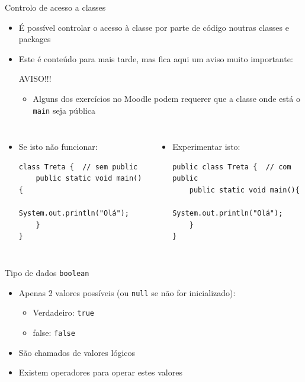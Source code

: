 \documentclass[portuguese, aspectratio=169, xcolor=table]{beamer}
\begin{document}
\begin{frame}[fragile]{Controlo de acesso a classes}
\begin{itemize}
    \item É possível controlar o acesso à classe por parte de código noutras classes e packages
    \item Este é conteúdo para mais tarde, mas fica aqui um aviso muito importante:
    \begin{alertblock}{AVISO!!!}
        \begin{itemize}
            \item Alguns dos exercícios no Moodle podem requerer que a classe onde está o \texttt{main} seja pública
        \end{itemize}
    \end{alertblock}
\end{itemize}
\begin{columns}
\begin{itemize}
\item Se isto não funcionar:
\begin{verbatim}
class Treta {  // sem public
    public static void main(){
        System.out.println("Olá");
    }
}
\end{verbatim}
\end{itemize}
\begin{itemize}
    \item Experimentar isto:
\begin{verbatim}
public class Treta {  // com public
    public static void main(){
        System.out.println("Olá");
    }
}
\end{verbatim}
\end{itemize}
\end{columns}
\end{frame}


\begin{frame}{Tipo de dados \texttt{boolean}}
\begin{itemize}
    \item Apenas 2 valores possíveis (ou \texttt{null} se não for inicializado):
    \begin{itemize}
        \item Verdadeiro: \texttt{true}
        \item false: \texttt{false}
    \end{itemize}
\item São chamados de valores lógicos
\item Existem operadores para operar estes valores
\end{itemize}
\end{frame}
\end{document}
